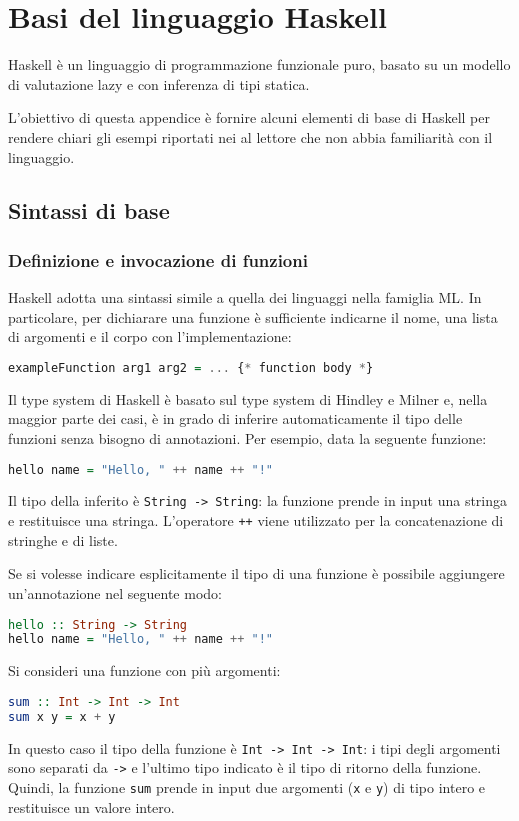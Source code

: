 \chapter{Basi del linguaggio Haskell}
\label{app:haskell}

Haskell è un linguaggio di programmazione funzionale puro, basato su un modello di valutazione lazy e con inferenza di tipi statica.

L'obiettivo di questa appendice è fornire alcuni elementi di base di Haskell per rendere chiari gli esempi riportati nei  al lettore che non abbia familiarità con il linguaggio.

\section{Sintassi di base}
\subsection{Definizione e invocazione di funzioni}
Haskell adotta una sintassi simile a quella dei linguaggi nella famiglia ML. In particolare, per dichiarare una funzione è sufficiente indicarne il nome, una lista di argomenti e il corpo con l'implementazione:
\begin{lstlisting}[language=haskell]
exampleFunction arg1 arg2 = ... {* function body *}
\end{lstlisting}

Il type system di Haskell è basato sul type system di Hindley e Milner e, nella maggior parte dei casi, è in grado di inferire automaticamente il tipo delle funzioni senza bisogno di annotazioni.
Per esempio, data la seguente funzione:
\begin{lstlisting}[language=haskell]
hello name = "Hello, " ++ name ++ "!"
\end{lstlisting}
Il tipo della inferito è \lstinline{String -> String}: la funzione prende in input una stringa e restituisce una stringa. L'operatore \lstinline{++} viene utilizzato per la concatenazione di stringhe e di liste.

Se si volesse indicare esplicitamente il tipo di una funzione è possibile aggiungere un'annotazione nel seguente modo:
\begin{lstlisting}[language=haskell]
hello :: String -> String
hello name = "Hello, " ++ name ++ "!"
\end{lstlisting}

Si consideri una funzione con più argomenti:
\begin{lstlisting}[language=haskell]
sum :: Int -> Int -> Int
sum x y = x + y
\end{lstlisting}
In questo caso il tipo della funzione è \lstinline{Int -> Int -> Int}: i tipi degli argomenti sono separati da \lstinline{->} e l'ultimo tipo indicato è il tipo di ritorno della funzione. Quindi, la funzione \lstinline{sum} prende in input due argomenti (\lstinline{x} e \lstinline{y}) di tipo intero e restituisce un valore intero.

